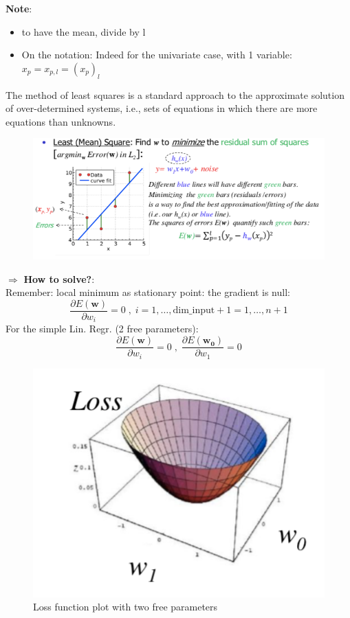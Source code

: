 \documentclass[../main.tex]{subfiles}
\begin{document}
\textbf{Note}: 
\begin{itemize}
    \item to have the mean, divide by l
    \item On the notation: Indeed for the univariate case, with 1 variable: $x_p = x_{p,l} = (x_p)_l$
\end{itemize}
The method of least squares is a standard approach to the approximate solution of over-determined systems, i.e., sets of equations in which there are more equations than unknowns.
\begin{figure}[H]
    \centering
    \includegraphics[scale = 0.5]{lectures/2_linear_model/learning_lms.png}
\end{figure}

\noindent $\Rightarrow$ \textbf{How to solve?}:\\
Remember: local minimum as stationary point: the gradient is null:
$$ \frac{\partial E(\mathbf{w})}{\partial{w_i}} = 0 \; , \; i = 1, \dots,  \text{dim\_input}+1 = 1, \dots,  n+1$$
For the simple Lin. Regr. (2 free parameters):
$$ \frac{\partial E(\mathbf{w})}{\partial{w_i}} = 0 \; , \; \frac{\partial E(\mathbf{w_0})}{\partial{w_1}} = 0 $$

\begin{figure}
    \centering
    \includegraphics[scale = 0.4]{lectures/2_linear_model/loss_gradient_2.png}
    \caption{Loss function plot with two free parameters}
    \label{fig:loss_gradient_2}
\end{figure}
\end{document}
